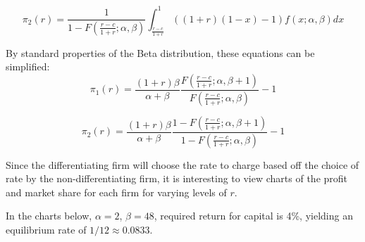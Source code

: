 \documentclass{article}
\theoremstyle{definition}
\begin{document}
\begin{equation}
\pi_2(r)=\frac{1}{1-F\left(\frac{r-c}{1+r};\alpha,\beta\right)}\int_{\frac{r-c}{1+r}} ^ 1 \left((1+r)(1-x)-1\right) f(x;\alpha,\beta)dx
\end{equation}

By standard properties of the Beta distribution, these equations can be simplified:
\begin{equation}
\pi_1(r)=\frac{(1+r)\beta}{\alpha+\beta}\frac{F\left(\frac{r-c}{1+r};\alpha,\beta+1\right)}{F\left(\frac{r-c}{1+r};\alpha,\beta\right)}-1
\end{equation}

\begin{equation}
\pi_2(r)=\frac{(1+r)\beta}{\alpha+\beta}\frac{1-F\left(\frac{r-c}{1+r};\alpha,\beta+1\right)}{1-F\left(\frac{r-c}{1+r};\alpha,\beta\right)}-1
\end{equation}



Since the differentiating firm will choose the rate to charge based off the choice of rate by the non-differentiating firm, it is interesting to view charts of the profit and market share for each firm for varying levels of \(r\).

In the charts below, \(\alpha=2\), \(\beta=48\), required return for capital is 4\%, yielding an equilibrium rate of \(1/12 \approx 0.0833\).
\end{document}
